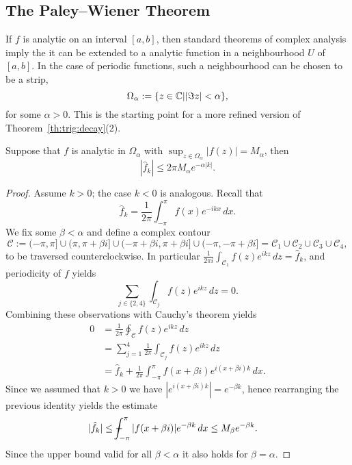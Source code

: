 \subsection{The Paley--Wiener Theorem}
%
\label{sec:trip:pw}
%
If $f$ is analytic on an interval $[a, b]$, then standard theorems of complex
analysis imply the it can be extended to a analytic function in a
neighbourhood $U$ of $[a, b]$. In the case of periodic functions, such a
neighbourhood can be chosen to be a strip,
\[
  \Omega_\alpha := \{ z \in \mathbb{C} | |\Im z| < \alpha \},
\]
for some $\alpha > 0$. This is the starting point for a more refined
version of Theorem~\ref{th:trig:decay}(2).

\begin{theorem} \label{th:trig:pw-trefversion}
  Suppose that $f$ is analytic in $\Omega_\alpha$ with
  $\sup_{z \in \Omega_\alpha} |f(z)| = M_\alpha$, then
  \[
    |\hat{f}_k| \leq 2\pi M_\alpha e^{-\alpha|k|}.
  \]
\end{theorem}
\begin{proof}
  Assume $k > 0$; the case $k < 0$ is analogous.
  Recall that
  \[
    \hat{f}_k = \frac{1}{2\pi} \int_{-\pi}^\pi f(x) e^{-ikx} \,dx.
  \]
  We fix some $\beta < \alpha$ and define a complex contour
  \[
    \mathcal{C} := (-\pi, \pi] \cup (\pi, \pi+ \beta i]
        \cup (-\pi + \beta i, \pi + \beta i] \cup (-\pi, -\pi + \beta i]
      = \mathcal{C}_{1} \cup \mathcal{C}_{2}
        \cup \mathcal{C}_{3} \cup \mathcal{C}_{4},
  \]
  to be traversed counterclockwise. In particular $\frac{1}{2\pi i} \int_{\mathcal{C}_1} f(z) e^{ikz} \, dz = \hat{f}_k$, and periodicity of $f$ yields
  \[
      \sum_{j \in \{2, 4\}}  \int_{\mathcal{C}_j} f(z) e^{ikz} \, dz = 0.
  \]
  Combining these observations with Cauchy's theorem yields
  \begin{align*}
      0
      &= \frac{1}{2\pi} \oint_{\mathcal{C}} f(z) e^{ikz} \, dz \\
      &= \sum_{j = 1}^4\frac{1}{2\pi} \int_{\mathcal{C}_j} f(z) e^{ikz} \, dz  \\
      &= \hat{f}_k + \frac{1}{2\pi} \int_{-\pi}^\pi f(x + \beta i) e^{i (x+\beta i) k} \, dx.
  \end{align*}
  Since we assumed that $k > 0$ we have $|e^{i (x+\beta i)k}| = e^{-\beta k}$, hence
  rearranging the previous identity yields the estimate
  \begin{align*}
    |\hat{f}_k| &\leq \mint_{-\pi}^\pi |f(x+\beta i)| e^{-\beta k} \,dx
      \leq M_\beta e^{-\beta k}.
  \end{align*}
  Since the upper bound valid for all $\beta < \alpha$ it also holds for $\beta
  = \alpha$.
\end{proof}


